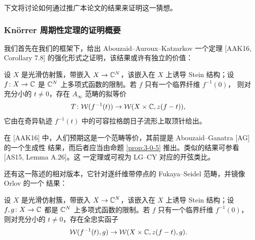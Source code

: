 下文将讨论如何通过推广本论文的结果来证明这一猜想。


\subsubsection{Kn{\"o}rrer 周期性定理的证明概要}

我们首先在我们的框架下，给出 Abouzaid--Auroux--Katzarkov 一个定理
[AAK16, Corollary 7.8] 的强化形式之证明，该结果或许有独立的价值：

\begin{theorem}\label{thm:aak-equiv}
设 $X$ 是光滑仿射簇，带嵌入 $X\to\mathbb{C}^N$，该嵌入在 $X$ 上诱导 Stein 结构；设
$f\colon X\to\mathbb{C}$ 是 $\mathbb{C}^N$ 上多项式函数的限制。若 $f$ 只有一个临界纤维 $f^{-1}(0)$，
则对充分小的 $t\neq0$，存在 $A_\infty$ 范畴的拟等价
\[
T\colon\mathcal{W}(f^{-1}(t))\to\mathcal{W}(X\times\mathbb{C},z(f-t)),
\]
它由在奇异轨迹 $f^{-1}(t)$ 中的可容拉格朗日子流形上取顶针给出。
\end{theorem}


在 [AAK16] 中，人们预期这是一个范畴等价，其前提是 Abouzaid--Ganatra [AG] 的一个生成性
结果，而后者应当由命题 \ref{prop:3-0-5} 推出。类似的结果可参看 [AS15, Lemma A.26]。这
一定理或可视为 LG--CY 对应的开弦类比。


还有这一陈述的相对版本，它针对逐纤维带停点的 Fukaya--Seidel 范畴，并镜像 Orlov 的一个
结果：

\begin{theorem}\label{thm:relative}
设 $X$ 是光滑仿射簇，带嵌入 $X\to\mathbb{C}^N$，该嵌入在 $X$ 上诱导 Stein 结构；设
$f,g\colon X\to\mathbb{C}$ 都是 $\mathbb{C}^N$ 上多项式函数的限制。若 $f$ 只有一个临界纤维
$f^{-1}(0)$，则对充分小的 $t\neq0$，存在全忠实函子
\[
\mathcal{W}(f^{-1}(t),g)\to\mathcal{W}(X\times\mathbb{C},z(f-t),g).
\]
\end{theorem}


